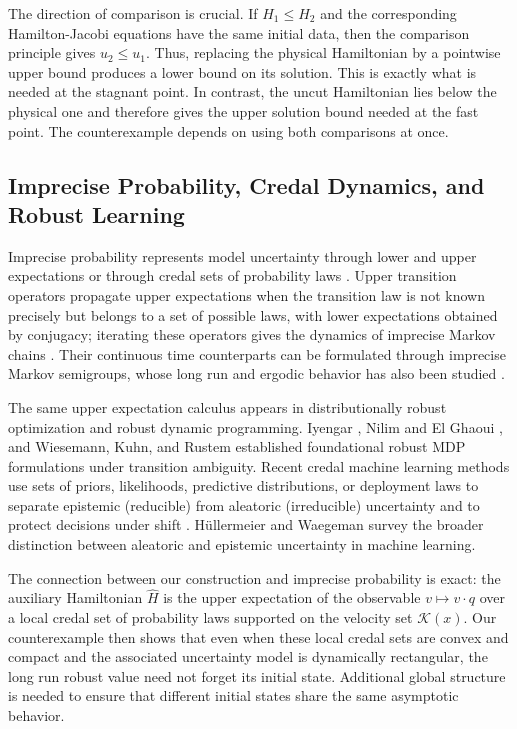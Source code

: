 \documentclass[11pt,reqno,noamsfonts]{amsart}
\theoremstyle{definition}
\theoremstyle{remark}
\begin{document}
The direction of comparison is crucial. If $H_1\le H_2$ and the
corresponding Hamilton-Jacobi equations have the same initial data,
then the comparison principle gives $u_2\le u_1$. Thus, replacing the
physical Hamiltonian by a pointwise upper bound produces a lower bound
on its solution.  This is exactly what is needed at the stagnant point.  In contrast, the uncut Hamiltonian lies below the physical one and therefore gives the upper solution bound needed at the fast point.  The counterexample depends on using both comparisons at once.

\subsection{Imprecise Probability, Credal Dynamics, and Robust Learning}\label{impr-prob-sec}
Imprecise probability represents model uncertainty through lower and upper expectations or through credal sets of probability laws \cite{AugustinEtAl2014,TroffaesDeCooman2014,Walley1991}.  Upper transition operators propagate upper expectations when the
transition law is not known precisely but belongs to a set of possible
laws, with lower expectations obtained by conjugacy; iterating these
operators gives the dynamics of imprecise Markov chains
\cite{DeCoomanHermansQuaeghebeur2009,HermansDeCooman2012,TJoensDeBock2021}.
Their continuous time counterparts can be formulated through imprecise
Markov semigroups, whose long run and ergodic behavior has also been
studied \cite{CaprioChen2026}.

The same upper expectation calculus appears in distributionally robust optimization and robust dynamic programming.  Iyengar \cite{Iyengar2005}, Nilim and El Ghaoui \cite{NilimElGhaoui2005}, and Wiesemann, Kuhn, and Rustem \cite{WiesemannKuhnRustem2013} established foundational robust MDP formulations under transition ambiguity.  Recent credal machine learning methods use sets of priors, likelihoods, predictive distributions, or deployment laws to separate epistemic (reducible) from aleatoric (irreducible) uncertainty and to protect decisions under shift \cite{CaprioEtAl2024,CaprioSultanaEliaCuzzolin2024,ChenBerrettDamoulasCaprio2026}.  H\"ullermeier and Waegeman \cite{HuellermeierWaegeman2021} survey the broader distinction between aleatoric and epistemic uncertainty in machine learning.

The connection between our construction and imprecise probability is
exact: the auxiliary Hamiltonian $\widehat H$ is the upper expectation
of the observable $v\mapsto v\cdot q$ over a local credal set of
probability laws supported on the velocity set $\mathcal K(x)$. Our counterexample then shows that even when
these local credal sets are convex and compact and the associated
uncertainty model is dynamically rectangular, the long run robust value
need not forget its initial state. Additional global structure is needed
to ensure that different initial states share the same asymptotic
behavior.
\end{document}
